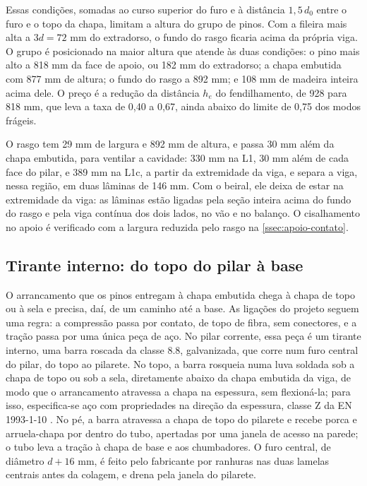 Essas condições, somadas ao curso superior do furo e à distância $1{,}5\,d_0$
entre o furo e o topo da chapa, limitam a altura do grupo de pinos. Com a fileira
mais alta a $3d = 72$ mm do extradorso, o fundo do rasgo ficaria acima da própria
viga. O grupo é posicionado na maior altura que atende às duas condições: o pino
mais alto a 818 mm da face de apoio, ou 182 mm do extradorso; a chapa embutida
com 877 mm de altura; o fundo do rasgo a 892 mm; e 108 mm de madeira inteira
acima dele. O preço é a redução da distância $h_e$ do fendilhamento, de 928 para
818 mm, que leva a taxa de 0,40 a 0,67, ainda abaixo do limite de 0,75 dos modos
frágeis.

O rasgo tem 29 mm de largura e 892 mm de altura, e passa 30 mm além da chapa
embutida, para ventilar a cavidade: 330 mm na L1, 30 mm além de cada face do
pilar, e 389 mm na L1c, a partir da extremidade da viga, e separa a viga, nessa região, em duas lâminas de 146 mm. Com o beiral,
ele deixa de estar na extremidade da viga: as lâminas estão ligadas pela seção
inteira acima do fundo do rasgo e pela viga contínua dos dois lados, no vão e no
balanço. O cisalhamento no apoio é verificado com a largura reduzida pelo rasgo
na \autoref{ssec:apoio-contato}.

\subsection{Tirante interno: do topo do pilar à base}\label{ssec:topo-pilar}

O arrancamento que os pinos entregam à chapa embutida chega à chapa de topo ou à
sela e precisa, daí, de um caminho até a base. As ligações do projeto seguem uma
regra: a compressão passa por contato, de topo de fibra, sem conectores, e a
tração passa por uma única peça de aço. No pilar corrente, essa peça é um tirante
interno, uma barra roscada da classe 8.8, galvanizada, que corre num furo central
do pilar, do topo ao pilarete. No topo, a barra rosqueia numa luva soldada sob a
chapa de topo ou sob a sela, diretamente abaixo da chapa embutida da viga, de
modo que o arrancamento atravessa a chapa na espessura, sem flexioná-la; para
isso, especifica-se aço com propriedades na direção da espessura, classe Z da
EN 1993-1-10 \cite{EN1993-1-10:2005}. No pé, a barra atravessa a chapa de topo do
pilarete e recebe porca e arruela-chapa por dentro do tubo, apertadas por uma
janela de acesso na parede; o tubo leva a tração à chapa de base e aos
chumbadores. O furo central, de diâmetro $d + 16$ mm, é feito pelo fabricante por
ranhuras nas duas lamelas centrais antes da colagem, e drena pela janela do
pilarete.

